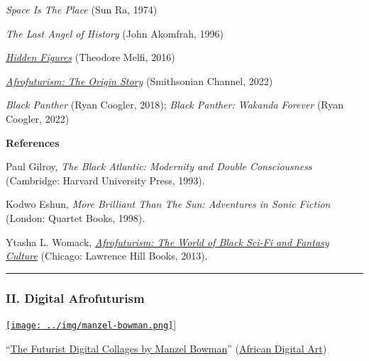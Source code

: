 \documentclass[
  letterpaper,
  DIV=11,
  numbers=noendperiod]{scrartcl}
\begin{document}
\emph{Space Is The Place} (Sun Ra, 1974)

\emph{The Last Angel of History} (John Akomfrah, 1996)

\href{https://www.justwatch.com/us/movie/hidden-figures}{\emph{Hidden
Figures}} (Theodore Melfi, 2016)

\href{https://www.smithsonianchannel.com/special/afrofuturism-the-origin-story}{\emph{Afrofuturism:
The Origin Story}} (Smithsonian Channel, 2022)

\emph{Black Panther} (Ryan Coogler, 2018); \emph{Black Panther: Wakanda
Forever} (Ryan Coogler, 2022)

\textbf{References}

Paul Gilroy, \emph{The Black Atlantic: Modernity and Double
Consciousness} (Cambridge: Harvard University Press, 1993).

Kodwo Eshun, \emph{More Brilliant Than The Sun: Adventures in Sonic
Fiction} (London: Quartet Books, 1998).

Ytasha L. Womack,
\href{https://ebookcentral.proquest.com/lib/emerson/reader.action?docID=1381831\&ppg=1}{\emph{Afrofuturism:
The World of Black Sci-Fi and Fantasy Culture}} (Chicago: Lawrence Hill
Books, 2013).

\begin{center}\rule{0.5\linewidth}{0.5pt}\end{center}

\hypertarget{ii.-digital-afrofuturism}{%
\subsubsection{II. Digital
Afrofuturism}\label{ii.-digital-afrofuturism}}

\href{https://www.manzel.biz/gallery}{\texttt{[image: ../img/manzel-bowman.png]}}{]}

``\href{https://www.africandigitalart.com/the-futurist-digital-collages-by-manzel-bowman/}{The
Futurist Digital Collages by Manzel Bowman}''
(\href{http://africandigitalart.com}{African Digital Art})
\end{document}
